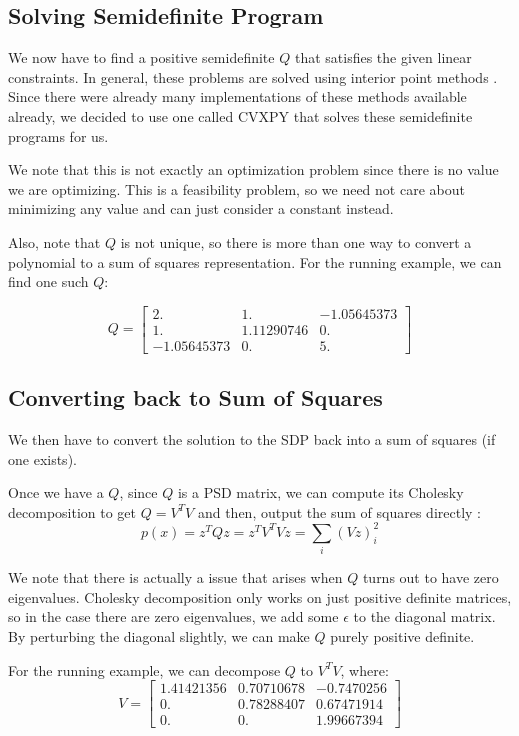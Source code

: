 \documentclass{article}
\begin{document}
\subsection{Solving Semidefinite Program}
We now have to find a positive semidefinite $Q$ that satisfies the given linear constraints. In general, these problems are solved using interior point methods \cite{sdp}. Since there were already many implementations of these methods available already, we decided to use one called CVXPY that solves these semidefinite programs for us.

We note that this is not exactly an optimization problem since there is no value we are optimizing. This is a feasibility problem, so we need not care about minimizing any value and can just consider a constant instead.

Also, note that $Q$ is not unique, so there is more than one way to convert a polynomial to a sum of squares representation. For the running example, we can find one such $Q$:

\[Q = \begin{bmatrix}
2.   &       1.    &     -1.05645373 \\
1.   &       1.11290746 & 0.        \\
-1.05645373 & 0.     &     5.        
\end{bmatrix}
\]

\subsection{Converting back to Sum of Squares}
We then have to convert the solution to the SDP back into a sum of squares (if one exists).

Once we have a $Q$, since $Q$ is a PSD matrix, we can compute its Cholesky
decomposition to get $Q = V^TV$ and then, output the sum of squares
directly \cite{sos_convex}: $$p(x) = z^TQz = z^TV^TVz = \sum_i (Vz)_i^2$$

We note that there is actually a issue that arises when $Q$ turns out to have zero eigenvalues. Cholesky decomposition only works on just positive definite matrices, so in the case there are zero eigenvalues, we add some $\epsilon$ to the diagonal matrix. By perturbing the diagonal slightly, we can make $Q$ purely positive definite.

For the running example, we can decompose $Q$ to $V^TV$, where:
\[V = \begin{bmatrix}
1.41421356 & 0.70710678 & -0.7470256 \\
0.         & 0.78288407 &  0.67471914 \\
0.         & 0.         &  1.99667394 
\end{bmatrix}\]
\end{document}
